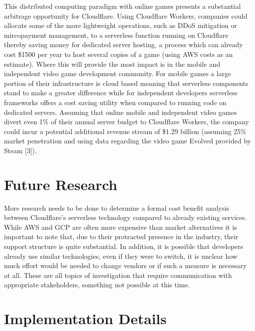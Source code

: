 \documentclass[a4paper, 11pt]{article}
\begin{document}
This distributed computing paradigm with online games presents a substantial arbitrage opportunity for Cloudflare. Using Cloudflare Workers, companies could allocate some of the more lightweight operations, such as DDoS mitigation or mircopayment management, to a serverless function running on Cloudflare thereby saving money for dedicated server hosting, a process which can already cost \$1500 per year to host several copies of a game (using AWS costs as an estimate). Where this will provide the most impact is in the mobile and independent video game development community. For mobile games a large portion of their infrastructure is cloud based meaning that serverless components stand to make a greater difference while for independent developers serverless frameworks offers a cost saving utility when compared to running code on dedicated servers. Assuming that online mobile and independent video games divert even 1\% of their annual server budget to Cloudflare Workers, the company could incur a potential additional revenue stream of \$1.29 billion (assuming 25\% market penetration and using data regarding the video game Evolved provided by Steam [3]).

\section{Future Research}

More research needs to be done to determine a formal cost benefit analysis between Cloudflare's serverless technology compared to already existing services. While AWS and GCP are often more expensive than market alternatives it is important to note that, due to their protracted presence in the industry, their support structure is quite substantial. In addition, it is possible that developers already use similar technologies, even if they were to switch, it is unclear how much effort would be needed to change vendors or if such a measure is necessary at all. These are all topics of investigation that require communication with appropriate stakeholders, something not possible at this time.

\section{Implementation Details}
\end{document}

